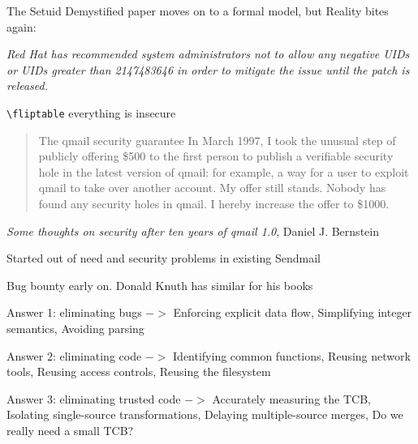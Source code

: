 \documentclass[Screen16to9,17pt]{foils}
\begin{document}
\begin{list2}
\item The Setuid Demystified paper moves on to a formal model,
but Reality bites again:\\
\item \emph{Red Hat has recommended system administrators not to allow any negative UIDs or UIDs greater than 2147483646 in order to mitigate the issue until the patch is released.}
\item \verb+\fliptable+ everything is insecure
\end{list2}







\begin{quote}
The qmail security guarantee
In March 1997, I took the unusual step of publicly offering
\$500 to the first person to publish a verifiable security hole
in the latest version of qmail: for example, a way for a user
to exploit qmail to take over another account. My offer still
stands. Nobody has found any security holes in qmail. I
hereby increase the offer to \$1000.
\end{quote}
\emph{Some thoughts on security after ten years of qmail 1.0},
Daniel J. Bernstein

\begin{list2}
\item Started out of need and security problems in existing Sendmail
\item Bug bounty early on. Donald Knuth has similar for his books
\end{list2}


\begin{list2}
\item Answer 1: eliminating bugs $->$ Enforcing explicit data flow, Simplifying integer semantics, Avoiding parsing
\item Answer 2: eliminating code  $->$ Identifying common functions, Reusing network tools, Reusing access controls, Reusing the filesystem
\item Answer 3: eliminating trusted code $->$ Accurately measuring the TCB, Isolating single-source transformations, Delaying multiple-source merges, Do we really need a small TCB?
\end{list2}
\end{document}
